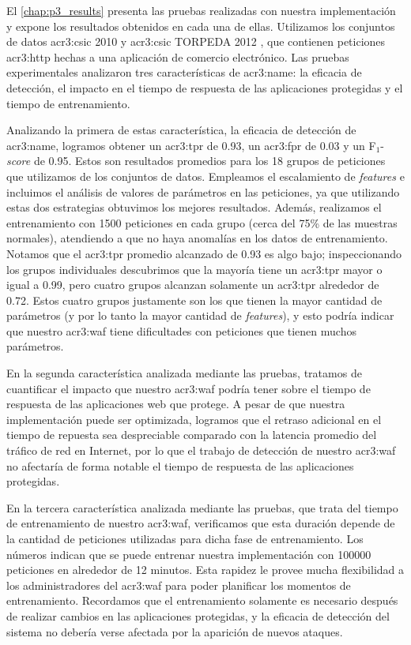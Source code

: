 El \autoref{chap:p3_results} presenta las pruebas realizadas con nuestra
implementación y expone los resultados obtenidos en cada una de ellas.
Utilizamos los conjuntos de datos \gls{acr3:csic} 2010 \citep{csic2010dataset}
y \gls{acr3:csic} TORPEDA 2012 \citep{torpeda2012dataset}, que contienen
peticiones \gls{acr3:http} hechas a una aplicación de comercio electrónico.
Las pruebas experimentales analizaron tres características de \gls{acr3:name}:
la eficacia de detección, el impacto en el tiempo de respuesta de las
aplicaciones protegidas y el tiempo de entrenamiento.

Analizando la primera de estas característica, la eficacia de detección
de \gls{acr3:name}, logramos obtener un \gls{acr3:tpr} de \num{0.93},
un \gls{acr3:fpr} de \num{0.03} y un F$_{1}$-\textit{score} de \num{0.95}.
Estos son resultados promedios para los 18 grupos de peticiones que
utilizamos de los conjuntos de datos.
Empleamos el escalamiento de \textit{features} e incluimos el análisis
de valores de parámetros en las peticiones, ya que utilizando estas dos
estrategias obtuvimos los mejores resultados. Además, realizamos el
entrenamiento con 1500 peticiones en cada grupo (cerca del 75\% de las
muestras normales), atendiendo a que no haya anomalías en los datos de
entrenamiento.
Notamos que el \gls{acr3:tpr} promedio alcanzado de \num{0.93} es algo
bajo; inspeccionando los grupos individuales descubrimos que la mayoría
tiene un \gls{acr3:tpr} mayor o igual a \num{0.99}, pero cuatro grupos
alcanzan solamente un \gls{acr3:tpr} alrededor de \num{0.72}. Estos cuatro
grupos justamente son los que tienen la mayor cantidad de parámetros (y
por lo tanto la mayor cantidad de \textit{features}), y esto podría indicar
que nuestro \gls{acr3:waf} tiene dificultades con peticiones que tienen
muchos parámetros.

En la segunda característica analizada mediante las pruebas, tratamos
de cuantificar el impacto que nuestro \gls{acr3:waf} podría tener sobre
el tiempo de respuesta de las aplicaciones web que protege. A pesar de
que nuestra implementación puede ser optimizada, logramos que el retraso
adicional en el tiempo de repuesta sea despreciable comparado con la
latencia promedio del tráfico de red en Internet, por lo que el trabajo
de detección de nuestro \gls{acr3:waf} no afectaría de forma notable
el tiempo de respuesta de las aplicaciones protegidas.

En la tercera característica analizada mediante las pruebas, que trata
del tiempo de entrenamiento de nuestro \gls{acr3:waf}, verificamos que
esta duración depende de la cantidad de peticiones utilizadas para dicha
fase de entrenamiento. Los números indican que se puede entrenar nuestra
implementación con \num{100000} peticiones en alrededor de 12 minutos.
Esta rapidez le provee mucha flexibilidad a los administradores del
\gls{acr3:waf} para poder planificar los momentos de entrenamiento.
Recordamos que el entrenamiento solamente es necesario después de realizar
cambios en las aplicaciones protegidas, y la eficacia de detección del
sistema no debería verse afectada por la aparición de nuevos ataques.

